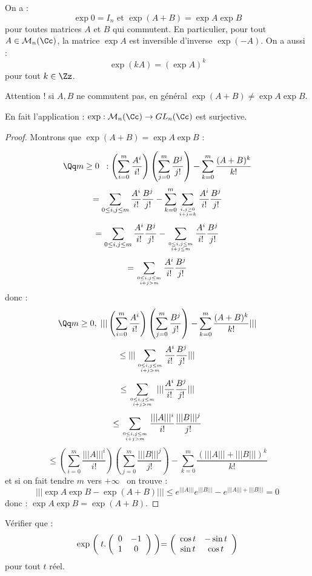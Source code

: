 \documentclass[class=report,crop=false]{standalone}
\newcommand{\GL}{GL}
\begin{document}
\begin{theoreme}
On a : \[\exp 0 = I_n \text{ et } \exp (A+B) = \exp A \exp B\]
pour toutes matrices $A$ et $B$ qui commutent. En particulier, pour tout $A \in \mathcal{M}_n(\Cc)$, la matrice $\exp A$ est inversible d'inverse $\exp (-A)$. On a aussi : \[\exp (kA) = (\exp A)^k \] pour tout $k\in \Zz$.
\end{theoreme}

\begin{remarque*}
Attention ! si $A,B$ ne commutent pas, en général $\exp (A+B) \neq \exp A \exp B$.
\end{remarque*}

\begin{remarque*}
En fait l'application : $\exp : \mathcal{M}_n(\Cc) \to \GL_n(\Cc)$ est surjective.
\end{remarque*}


\begin{proof}
Montrons que $\exp (A+B) = \exp A \exp B$ :

\[\Qq m \ge 0 \;\; : \left( \sum_{i=0}^m \frac{A^i}{i!} \right)\left(\sum_{j=0}^m\frac{B^j}{j!}\right)  - \sum_{k=0}^m \frac{(A+B)^k}{k!} \]
\[ = \sum_{0\le i,j \le m }\frac{A^i}{i!}\frac{B^j}{j!} - \sum_{k=0}^m \sum_{i,j \ge 0\atop i+j =k  } \frac{A^i}{i!}\frac{B^j}{j!}\]
\[=\sum_{0\le i,j \le m }\frac{A^i}{i!}\frac{B^j}{j!} - \sum_{0\le i,j \le m \atop i +j \le m}\frac{A^i}{i!}\frac{B^j}{j!}  \]
\[= \sum_{0\le i,j \le m \atop i+j > m }\frac{A^i}{i!}\frac{B^j}{j!} \]
donc :
\[\Qq m\ge 0,\;||| \left( \sum_{i=0}^m \frac{A^i}{i!} \right)\left(\sum_{j=0}^m\frac{B^j}{j!}\right)  - \sum_{k=0}^m \frac{(A+B)^k}{k!} ||| \]\[\le  |||\sum_{0\le i,j \le m \atop i+j > m }\frac{A^i}{i!}\frac{B^j}{j!}||| \]
\[\le \sum_{0\le i,j \le m \atop i+j > m }|||\frac{A^i}{i!}\frac{B^j}{j!}|||\]
\[\le \sum_{0\le i,j \le m \atop i+j > m }\frac{|||A|||^i}{i!}\frac{|||B|||^j}{j!}\]
\[\le \left( \sum_{i=0}^m \frac{|||A|||^i}{i!} \right)\left(\sum_{j=0}^m\frac{|||B|||^j}{j!}\right)  - \sum_{k=0}^m \frac{(|||A|||+|||B|||)^k}{k!}\]
et si \og on fait tendre $m$ vers $+\infty$ \fg\, on trouve :
\[|||\exp A \exp B -\exp (A+B)||| \le e^{|||A|||} e^{|||B|||} -e^{|||A||| + |||B|||} = 0\]
donc : $\exp A \exp B = \exp (A+B)$.
\end{proof}
\begin{exercicecours}
Vérifier que : \[\exp \biggm (t.\left(\begin{array}{cc}
0 & -1\\
 1& 0
\end{array}\right)\biggm ) = \left(\begin{array}{cc}
\cos t &- \sin t \\
\sin t & \cos t
\end{array}\right)\] pour tout $t$ réel.

\end{exercicecours}
\end{document}
